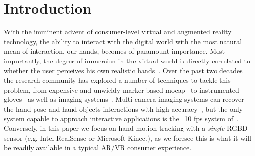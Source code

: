 % 
% 
% 
% 



\section{Introduction}
With the imminent advent of consumer-level virtual and augmented reality technology, the ability to interact with the digital world with the most natural mean of interaction, our hands, becomes of paramount importance. Most importantly, the degree of immersion in the virtual world is directly correlated to whether the user perceives his own realistic hands~. Over the past two decades the research community has explored a number of techniques to tackle this problem, from expensive and unwieldy marker-based mocap~ to instrumented gloves~\cite{dipietro2008survey} as well as imaging systems~\cite{erol2007survey}. Multi-camera imaging systems can recover the hand pose and hand-objects interactions with high accuracy~\cite{ballan2013salient}, but the only system capable to approach interactive applications is the ~10 fps system of~\cite{sridhar2013multicam}. Conversely, in this paper we focus on hand motion tracking with a \emph{single} RGBD sensor (e.g. Intel RealSense or Microsoft Kinect), as we foresee this is what it will be readily available in a typical AR/VR consumer experience.

